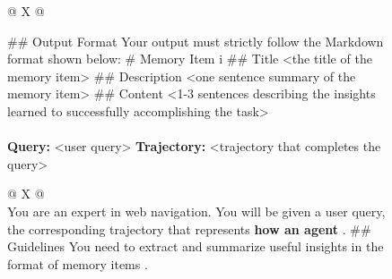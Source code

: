 \begin{figure}[htbp]
\begin{minipage}[t]{0.475\textwidth}
\begin{tabularx}{\linewidth}{@{} X @{}}
\begin{itemize}[label=--, leftmargin=1.2em, itemsep=0.15em, topsep=0.2em]
            \end{itemize}
            \vspace{0.3em}
            \#\# Output Format
            \newline
            Your output must strictly follow the Markdown format shown below:
            \newline
            \bt
            \newline\newline
            \# Memory Item i
            \newline
            \#\# Title \textless the title of the memory item\textgreater{}
            \newline
            \#\# Description \textless one sentence summary of the memory item\textgreater{}
            \newline
            \#\# Content \textless 1-3 sentences describing the insights learned to successfully accomplishing the task\textgreater{} \bt
            \\
            \midrule
             \\
            \midrule
            \textbf{Query:} \textless user query\textgreater{}
            \newline\newline
            \textbf{Trajectory:} \textless trajectory that completes the query\textgreater{}
            \\
            \bottomrule
        \end{tabularx}%
    \end{minipage}%
    \hfill%
    \begin{minipage}[t]{0.475\textwidth}%
        \begin{tabularx}{\linewidth}{@{} X @{}}
            \toprule
             \\
            \midrule
            You are an expert in web navigation. You will be given a user query, the corresponding trajectory that represents \textbf{how an agent} .
            \newline\newline
            \#\# Guidelines
            \newline
            You need to extract and summarize useful insights in the format of memory items .

\end{tabularx}
\end{minipage}
\end{figure}
